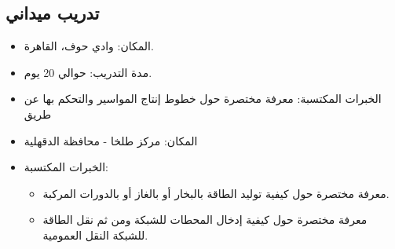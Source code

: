 \subsection{تدريب ميداني}%
\begin{tcolorbox}[enhanced,bidibreakable,title={\blackout{شركة عثمان أحمد عثمان للمواسير الخرسانية} | متدرَّب\\
من يونيو 2017 إلى يوليو 2017}]
	\begin{itemize}[nosep,leftmargin=*,align=left]
		\item المكان: وادي حوف، القاهرة.
		\item مدة التدريب: حوالي 20 يوم.
		\item الخبرات المكتسبة: معرفة مختصرة حول خطوط إنتاج المواسير والتحكم بها عن طريق 
	\end{itemize}
\end{tcolorbox}
	\begin{tcolorbox}[enhanced,bidibreakable,title={%
		\blackout{محطة كهرباء طلخا} |
		متدرب
		\\
		من يوليو 2016 إلى أغسطس 2016
	}]

	\begin{itemize}[nosep,leftmargin=*,align=left]
		\item المكان: مركز طلخا - محافظة الدقهلية 
		\item الخبرات المكتسبة: 
		\begin{itemize}[nosep,align=left,leftmargin=*]
			\item معرفة مختصرة حول كيفية توليد الطاقة بالبخار أو بالغاز أو بالدورات المركبة.
			\item معرفة مختصرة حول كيفية إدخال المحطات للشبكة ومن ثم نقل الطاقة للشبكة النقل العمومية.
		\end{itemize}
	\end{itemize}%
\end{tcolorbox}

